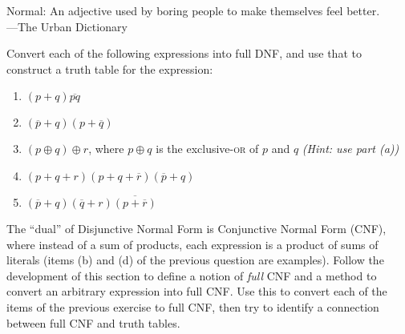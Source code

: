 \begin{tailquote}
Normal: An adjective used by boring people to make themselves feel better.\\
\hfill---The Urban Dictionary
\end{tailquote}

\begin{exercises}
\item Convert each of the following expressions into full DNF, and use that to construct a truth table for the expression:
\begin{enumerate}
\item $(p+q)\overline{pq}$
\item $(\overline{p}+q)(p+\overline{q})$
\item $(p\oplus q)\oplus r$, where $p\oplus q$ is the exclusive-\textsc{or} of $p$ and $q$ \textit{(Hint: use part (a))}
\item $(p+q+r)(p+q+\overline{r})(\overline{p}+q)$
\item $(\overline{p}+q)(\overline{q}+r)\overline{(p+\overline{r})}$
\end{enumerate}

\item\label{ex:CNF} The ``dual'' of Disjunctive Normal Form is Conjunctive Normal Form (CNF), where instead of a sum of products, each expression is a product of sums of literals (items (b) and (d) of the previous question are examples). Follow the development of this section to define a notion of \textit{full} CNF and a method to convert an arbitrary expression into full CNF. Use this to convert each of the items of the previous exercise to full CNF, then try to identify a connection between full CNF and truth tables.
\end{exercises}


